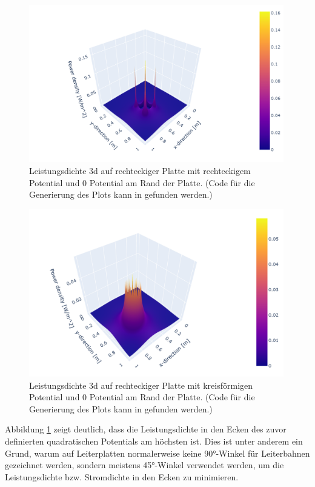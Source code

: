 \begin{figure}[h]
	\centering
	\includegraphics[width=0.99\textwidth]{papers/circuit/3d.png}
	\caption{Leistungsdichte 3d auf rechteckiger Platte mit rechteckigem Potential und 0 Potential am Rand der Platte. (Code für die Generierung des Plots kann in \cite{github:AndreasFMueller} gefunden werden.)}
	\label{fig:power_3d_rectangle}
\end{figure}
\begin{figure}[h]
	\centering
	\includegraphics[width=0.99\textwidth]{papers/circuit/3d_circle.png}
	\caption{Leistungsdichte 3d auf rechteckiger Platte mit kreisförmigen Potential und 0 Potential am Rand der Platte. (Code für die Generierung des Plots kann in \cite{github:AndreasFMueller} gefunden werden.)}
	\label{fig:power_3d_circle}
\end{figure}
Abbildung \ref{fig:power_3d_rectangle} zeigt deutlich, dass die Leistungsdichte in den Ecken des zuvor definierten quadratischen Potentials am höchsten ist. Dies ist unter anderem ein Grund, warum auf Leiterplatten normalerweise keine 90°-Winkel für Leiterbahnen gezeichnet werden, sondern meistens 45°-Winkel verwendet werden, um die Leistungsdichte bzw. Stromdichte in den Ecken zu minimieren. 
